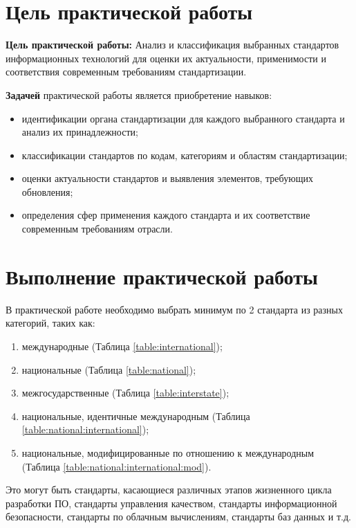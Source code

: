 \section*{\LARGE Цель практической работы}

\textbf{Цель практической работы:}
Анализ и классификация выбранных стандартов информационных
технологий для оценки их актуальности, применимости и соответствия
современным требованиям стандартизации.

\textbf{Задачей} практической работы является приобретение навыков:
\begin{itemize}
	\item идентификации органа стандартизации для каждого выбранного
		стандарта и анализ их принадлежности;
	\item классификации стандартов по кодам, категориям и областям
		стандартизации;
	\item оценки актуальности стандартов и выявления элементов, требующих
		обновления;
	\item определения сфер применения каждого стандарта и их соответствие
		современным требованиям отрасли.
\end{itemize}

\clearpage

\section*{\LARGE Выполнение практической работы}

В практической работе необходимо выбрать
минимум по 2 стандарта из разных категорий, таких как:

\begin{enumerate}
	\item международные (Таблица \ref{table:international});
	\item национальные (Таблица \ref{table:national});
	\item межгосударственные (Таблица \ref{table:interstate});
	\item национальные,
		идентичные международным (Таблица \ref{table:national:international});
	\item национальные,
		модифицированные по отношению к международным
		(Таблица \ref{table:national:international:mod}).
\end{enumerate}

Это могут быть стандарты, касающиеся различных этапов жизненного
цикла разработки ПО, стандарты управления качеством, стандарты
информационной безопасности, стандарты по облачным вычислениям,
стандарты баз данных и т.д.

